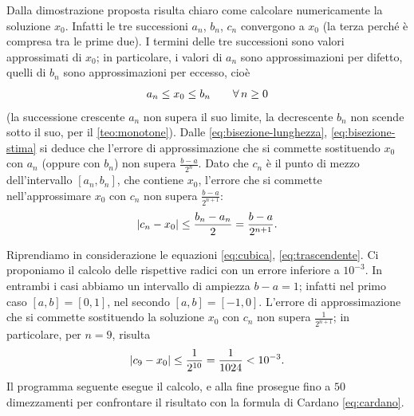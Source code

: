 Dalla dimostrazione proposta risulta chiaro come calcolare numericamente la soluzione
$x_{0}$. Infatti le tre successioni $a_{n}$, $b_{n}$, $c_{n}$ convergono a $x_{0}$ (la terza
perché è compresa tra le prime due). I termini delle tre successioni sono valori
approssimati di $x_{0}$; in particolare, i valori di $a_{n}$ sono approssimazioni per
difetto, quelli di $b_{n}$ sono approssimazioni per eccesso, cioè
\begin{equation}\label{eq:bisezione-stima}
  a_{n}\le x_{0}\le b_{n} \qquad\forall\, n\ge0
\end{equation}
(la successione crescente $a_{n}$ non supera il suo limite, la decrescente $b_{n}$ non
scende sotto il suo, per il \cref{teo:monotone}). Dalle \eqref{eq:bisezione-lunghezza},
\eqref{eq:bisezione-stima} si deduce che l'errore di approssimazione che si commette
sostituendo $x_{0}$ con $a_{n}$ (oppure con $b_{n}$) non supera $\frac{b-a}{2^{n}}$. Dato
che $c_{n}$ è il punto di mezzo dell'intervallo $[a_{n},b_{n}]$, che contiene $x_{0}$,
l'errore che si commette nell'approssimare $x_{0}$ con $c_{n}$ non supera
$\frac{b-a}{2^{n+1}}$:
\begin{equation}\label{eq:bisezione-errore}
  \lvert c_{n}-x_{0}\rvert\le\frac{b_{n}-a_{n}}2=\frac{b-a}{2^{n+1}} .
\end{equation}

Riprendiamo in considerazione le equazioni \eqref{eq:cubica}, \eqref{eq:trascendente}.
Ci proponiamo il calcolo delle rispettive radici con un errore inferiore a $10^{-3}$. In
entrambi i casi abbiamo un intervallo di ampiezza $b-a=1$; infatti nel primo caso
$[a,b]=[0,1]$, nel secondo $[a,b]=[-1,0]$. L'errore di approssimazione che si commette
sostituendo la soluzione $x_{0}$ con $c_{n}$ non supera $\frac1{2^{n+1}}$; in particolare,
per $n=9$, risulta
\begin{equation}\label{eq:bisezione-c9}
  \lvert c_{9}-x_{0}\rvert\le\frac1{2^{10}}=\frac1{1024}<10^{-3} .
\end{equation}
Il programma seguente esegue il calcolo, e alla fine prosegue fino a $50$ dimezzamenti
per confrontare il risultato con la formula di Cardano \eqref{eq:cardano}.

